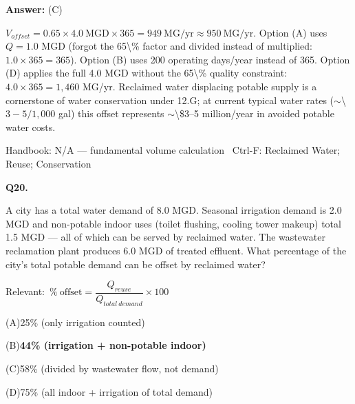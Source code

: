 \documentclass[11pt]{article}
\newcommand{\correct}[1]{\textbf{#1}\;{\color{accent}$\checkmark$}}
\newcommand{\optline}[2]{\par\noindent\hspace{1.2em}(#1)\hspace{0.6em}#2}
\begin{document}
\vspace{2pt}\par\noindent\colorbox{boxbg}{\parbox{\dimexpr\linewidth-2\fboxsep\relax}{%
\vspace{2pt}\textbf{Answer:} (C)\par\vspace{2pt}
{\small $V_{offset} = 0.65\times4.0\ \mathrm{MGD}\times365 = 949\ \mathrm{MG/yr}\approx950\ \mathrm{MG/yr}$. Option (A) uses $Q = 1.0$ MGD (forgot the 65\textbackslash{}\% factor and divided instead of multiplied: $1.0\times365 = 365$). Option (B) uses 200 operating days/year instead of 365. Option (D) applies the full 4.0 MGD without the 65\textbackslash{}\% quality constraint: $4.0\times365 = 1{,}460$ MG/yr. Reclaimed water displacing potable supply is a cornerstone of water conservation under 12.G; at current typical water rates ($\sim$\textbackslash{}$3-5/1{,}000$ gal) this offset represents $\sim$\textbackslash{}\$3--5 million/year in avoided potable water costs.}\par\vspace{2pt}
{\footnotesize\color{soft}Handbook: N/A --- fundamental volume calculation \textbullet\ Ctrl-F: Reclaimed Water; Reuse; Conservation}\vspace{2pt}
}}
\vspace{9pt}
\filbreak
\textbf{\color{accent}Q20.}\par\vspace{2pt}
A city has a total water demand of 8.0 MGD. Seasonal irrigation demand is 2.0 MGD and non-potable indoor uses (toilet flushing, cooling tower makeup) total 1.5 MGD --- all of which can be served by reclaimed water. The wastewater reclamation plant produces 6.0 MGD of treated effluent. What percentage of the city's total potable demand can be offset by reclaimed water?\par\vspace{3pt}
{\small\color{soft}Relevant:}\ $\%\ \text{offset} = \dfrac{Q_{reuse}}{Q_{total\ demand}}\times100$\par\vspace{3pt}
\optline{A}{25\% (only irrigation counted)}
\optline{B}{\correct{44\% (irrigation + non-potable indoor)}}
\optline{C}{58\% (divided by wastewater flow, not demand)}
\optline{D}{75\% (all indoor + irrigation of total demand)}
\par\vspace{3pt}
\end{document}
